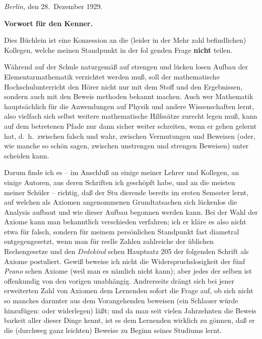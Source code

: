 {\sl Berlin,} den 28.~Dezember 1929.
\bigskip

\vfill\eject


\line{}\baselineskip
\centerline{\bf Vorwort f\"ur den Kenner.}
\bigskip

Dies B\"uchlein ist eine Konzession an die (leider in der Mehr%
zahl befindlichen) Kollegen, welche meinen Standpunkt in der fol%
genden Frage {\bf nicht} teilen.

W\"ahrend auf der Schule naturgem\"a{\ss} auf strengen und l\"ucken%
losen Aufbau der Elementarmathematik verzichtet werden mu{\ss},
soll der mathematische Hochschulunterricht den H\"orer nicht nur
mit dem Stoff und den Ergebnissen, sondern auch mit den Beweis%
methoden bekannt machen.  Auch wer Mathematik haupts\"achlich
f\"ur die Anwendungen auf Physik und andere Wissenschaften lernt,
also vielfach sich selbst weitere mathematische Hilfss\"atze zurecht%
legen mu{\ss}, kann auf dem betretenen Pfade nur dann sicher weiter%
schreiten, wenn er gehen gelernt hat, d.~h.\ zwischen falsch und
wahr, zwischen Vermutungen und Beweisen (oder, wie manche so
sch\"on sagen, zwischen unstrengen und strengen Beweisen) unter%
scheiden kann.

Darum finde ich es -- im Anschlu{\ss} an einige meiner Lehrer
und Kollegen, an einige Autoren, aus deren Schriften ich gesch\"opft
habe, und an die meisten meiner Sch\"uler -- richtig, da{\ss} der Stu%
dierende bereits im ersten Semester lernt, auf welchen als Axiomen
angenommenen Grundtatsachen sich l\"uckenlos die Analysis aufbaut
und wie dieser Aufbau begonnen werden kann.  Bei der Wahl
der Axiome kann man bekanntlich verschieden verfahren; ich er%
kl\"are es also nicht etwa f\"ur falsch, sondern f\"ur meinem pers\"onlichen
Standpunkt fast diametral entgegengesetzt, wenn man f\"ur reelle
Zahlen zahlreiche der \"ublichen Rechengesetze und den {\sl Dedekind\/}%
schen Hauptsatz 205 der folgenden Schrift als Axiome postuliert.
Gewi{\ss} beweise ich nicht die Widerspruchslosigkeit der f\"unf {\sl Peano\/}%
schen Axiome (weil man es n\"amlich nicht kann); aber jedes der%
selben ist offenkundig von den vorigen unabh\"angig.  Andrerseits
dr\"angt sich bei jener erweiterten Zahl von Axiomen dem Lernenden
sofort die Frage auf, ob sich nicht so manches darunter aus dem
Vorangehenden beweisen (ein Schlauer w\"urde hinzuf\"ugen: oder
widerlegen) l\"a{\ss}t; und da man seit vielen Jahrzehnten die Beweis%
barkeit aller dieser Dinge kennt, ist es dem Lernenden wirklich
zu g\"onnen, da{\ss} er die (durchweg ganz leichten) Beweise zu Beginn
seines Studiums lernt.


